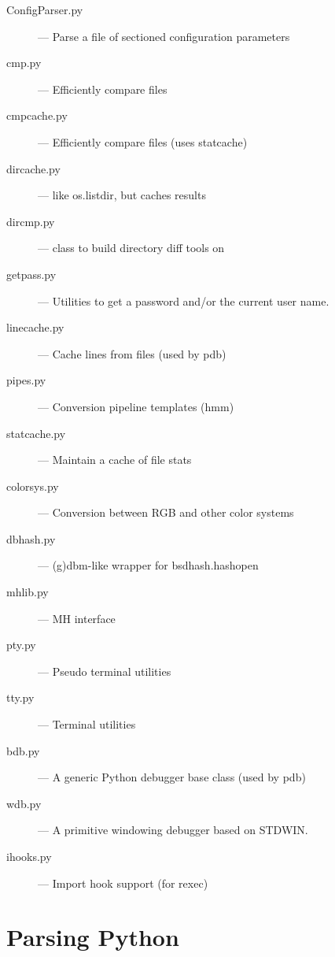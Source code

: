 \begin{description}
\item[ConfigParser.py]
--- Parse a file of sectioned configuration parameters

\item[cmp.py]
--- Efficiently compare files

\item[cmpcache.py]
--- Efficiently compare files (uses statcache)

\item[dircache.py]
--- like os.listdir, but caches results

\item[dircmp.py]
--- class to build directory diff tools on

\item[getpass.py]
--- Utilities to get a password and/or the current user name.

\item[linecache.py]
--- Cache lines from files (used by pdb)

\item[pipes.py]
--- Conversion pipeline templates (hmm)

\item[statcache.py]
--- Maintain a cache of file stats

\item[colorsys.py]
--- Conversion between RGB and other color systems

\item[dbhash.py]
--- (g)dbm-like wrapper for bsdhash.hashopen

\item[mhlib.py]
--- MH interface

\item[pty.py]
--- Pseudo terminal utilities

\item[tty.py]
--- Terminal utilities

\item[bdb.py]
--- A generic Python debugger base class (used by pdb)

\item[wdb.py]
--- A primitive windowing debugger based on STDWIN.

\item[ihooks.py]
--- Import hook support (for rexec)
\end{description}


\section{Parsing Python}

